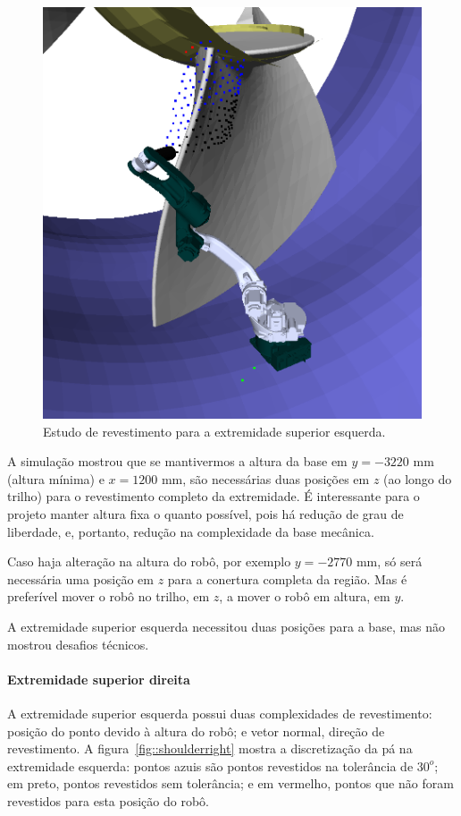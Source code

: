 \begin{figure}[!ht]
	\centering	
	\includegraphics[width=.5\columnwidth]{method/figs/shoulderleft.png}
	\caption{Estudo de revestimento para a extremidade superior esquerda.}
	\label{fig::shoulderleft}
\end{figure}

A simulação mostrou que se mantivermos a altura da base em $y=-3220$ mm
(altura mínima) e $x=1200$ mm, são necessárias duas posições em $z$ (ao longo do
trilho) para o revestimento completo da extremidade. É interessante para o
projeto manter altura fixa o quanto possível, pois há redução de grau de
liberdade, e, portanto, redução na complexidade da base mecânica.

Caso haja alteração na altura do robô, por exemplo  $y=-2770$ mm, só será
necessária uma posição em $z$ para a conertura completa da região. Mas é
preferível mover o robô no trilho, em $z$, a mover o robô em altura, em $y$. 

A extremidade superior esquerda necessitou duas posições para a base, mas não
mostrou desafios técnicos.

\paragraph{Extremidade superior direita}

A extremidade superior esquerda possui duas complexidades de revestimento:
posição do ponto devido à altura do robô; e vetor normal, direção de
revestimento. A figura~\ref{fig::shoulderright} mostra a discretização da pá na
extremidade esquerda: pontos azuis são pontos revestidos na tolerância de $30^o$; em preto, pontos revestidos sem tolerância; e em vermelho, pontos que
não foram revestidos para esta posição do robô.

